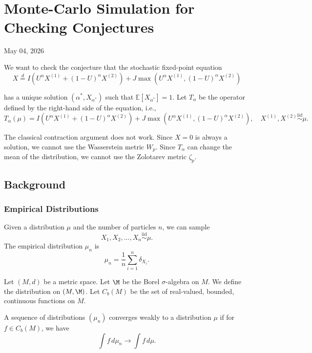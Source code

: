 \chapter{Monte-Carlo Simulation for Checking Conjectures}
\begin{center}
  May 04, 2026
  \vspace{0.5cm}
\end{center}

We want to check the conjecture that the stochastic fixed-point equation
\begin{equation}
  X \stackrel{d}{=} I(U^{\alpha}X^{(1)} + (1-U)^{\alpha}X^{(2)}) + J\max(U^{\alpha}X^{(1)}, (1-U)^{\alpha}X^{(2)})
\end{equation}

has a unique solution $(\alpha^*, X_{\alpha^*})$ such that $\mathbb{E}[X_{\alpha^*}] = 1$. Let $T_\alpha$ be the operator defined by the right-hand side of the equation, i.e.,
\begin{equation}
  T_\alpha(\mu) = I(U^{\alpha}X^{(1)} + (1-U)^{\alpha}X^{(2)}) + J\max(U^{\alpha}X^{(1)}, (1-U)^{\alpha}X^{(2)}), \quad X^{(1)}, X^{(2)} \overset{\text{iid}}{\sim} \mu.
\end{equation}


The classical contraction argument does not work. Since $X=0$ is always a solution, we cannot use the Wasserstein metric $W_p$. Since $T_\alpha$ can change the mean of the distribution, we cannot use the Zolotarev metric $\zeta_p$.

\section{Background}
\subsection{Empirical Distributions}

Given a distribution $\mu$ and the number of particles $n$, we can sample
$$X_1, X_2, \ldots, X_n \overset{\text{iid}}{\sim} \mu.$$
The empirical distribution $\mu_n$ is
$$\mu_n = \frac{1}{n} \sum_{i=1}^n \delta_{X_i}.$$

\begin{definition}
  Let $(M,d)$ be a metric space. Let $\M$ be the Borel $\sigma$-algebra on $M$. We define the distribution on $(M, \M)$. Let $C_b(M)$ be the set of real-valued, bounded, continuous functions on $M$.

  A sequence of distributions $(\mu_n)$ converges weakly to a distribution $\mu$ if for $f\in C_b(M)$, we have
  $$\int f \, d\mu_n \to \int f \, d\mu.$$
\end{definition}

